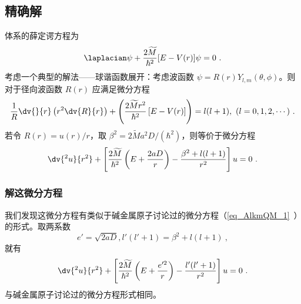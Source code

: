\subsection{精确解}
体系的薛定谔方程为
\begin{equation}
\laplacian \psi + \frac{2 \widetilde M}{\hbar^2} [E - V(r)] \psi = 0~.
\end{equation}
考虑一个典型的解法——球谐函数展开：考虑波函数 $\psi = R(r) Y_{l, m} (\theta, \phi)$。则对于径向波函数 $R(r)$ 应满足微分方程
\begin{equation}
\frac1R \dv{}{r}\left(r^2 \dv{R}{r}\right) + \left( \frac{2\widetilde M r^2}{\hbar^2} \left[E-V(r)\right] \right) = l(l+1), \ (l = 0, 1, 2, \cdots) ~.
\end{equation}
若令 $R(r) = u(r)/r$，取 $\beta^2=2\widetilde M a^2 D/(\hbar^2)$，则等价于微分方程
\begin{equation}
\dv{^2 u}{r^2} + \left[\frac{2\widetilde M}{\hbar^2} \left(E + \frac{2aD}{r}\right) - \frac{\beta^2 + l(l+1)}{r^2}\right] u = 0 ~.
\end{equation}

\subsubsection{解这微分方程}
我们发现这微分方程有类似于碱金属原子讨论过的微分方程（\autoref{eq_AlkmQM_1}~）的形式。取两系数
\begin{equation}
e' = \sqrt{2aD}, l'(l'+1) = \beta^2 + l(l+1) ~,
\end{equation}
就有
\begin{equation}
\dv{^2 u}{r^2} + \left[ \frac{2 \widetilde M}{\hbar^2} \left(E + \frac{e'^2}{r}\right)  - \frac{l'(l'+1)}{r^2}\right] u = 0 ~.
\end{equation}
与碱金属原子讨论过的微分方程形式相同。